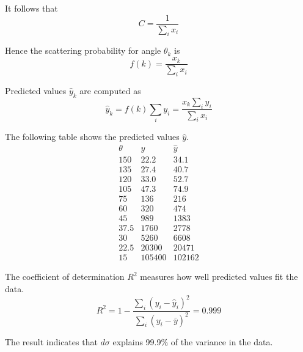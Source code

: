It follows that
\begin{equation*}
C=\frac{1}{\sum_i x_i}
\end{equation*}

Hence the scattering probability for angle $\theta_k$ is
\begin{equation*}
f(k)=\frac{x_k}{\sum_i x_i}
\end{equation*}

Predicted values $\hat y_k$ are computed as
\begin{equation*}
\hat y_k=f(k)\sum_i y_i=\frac{x_k\sum_i y_i}{\sum_i x_i}
\end{equation*}

The following table shows the predicted values $\hat y$.
\begin{equation*}
\begin{matrix}
\theta & y & \hat y\\
150 & 22.2 & 34.1\\
135 & 27.4 & 40.7\\
120 & 33.0 & 52.7\\
105 & 47.3 & 74.9\\
75 & 136 & 216\\
60 & 320 & 474\\
45 & 989 & 1383\\
37.5 & 1760 & 2778\\
30 & 5260 & 6608\\
22.5 & 20300 & 20471\\
15 & 105400 & 102162
\end{matrix}
\end{equation*}

The coefficient of determination $R^2$ measures how well predicted values fit the data.
\begin{equation*}
R^2=1-\frac{\sum_i(y_i-\hat y_i)^2}{\sum_i(y_i-\bar y)^2}=0.999
\end{equation*}

The result indicates that $d\sigma$ explains 99.9\%
of the variance in the data.


